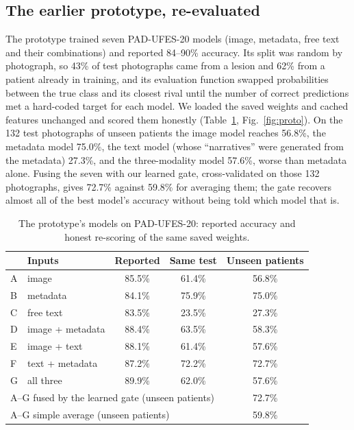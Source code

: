 \documentclass[conference]{IEEEtran}
\begin{document}
\subsection{The earlier prototype, re-evaluated}
\label{sec:proto}
The prototype trained seven PAD-UFES-20 models (image, metadata, free text and their combinations) and reported 84--90\% accuracy. Its split was random by photograph, so 43\% of test photographs came from a lesion and 62\% from a patient already in training, and its evaluation function swapped probabilities between the true class and its closest rival until the number of correct predictions met a hard-coded target for each model. We loaded the saved weights and cached features unchanged and scored them honestly (Table~\ref{tab:proto}, Fig.~\ref{fig:proto}). On the 132 test photographs of unseen patients the image model reaches 56.8\%, the metadata model 75.0\%, the text model (whose ``narratives'' were generated from the metadata) 27.3\%, and the three-modality model 57.6\%, worse than metadata alone. Fusing the seven with our learned gate, cross-validated on those 132 photographs, gives 72.7\% against 59.8\% for averaging them; the gate recovers almost all of the best model's accuracy without being told which model that is.

\begin{table}[!t]
\caption{The prototype's models on PAD-UFES-20: reported accuracy and honest re-scoring of the same saved weights.}
\label{tab:proto}
\centering\footnotesize
\begin{tabular}{llccc}
\toprule
 & Inputs & Reported & Same test & Unseen patients \\
\midrule
A & image & 85.5\% & 61.4\% & 56.8\% \\
B & metadata & 84.1\% & 75.9\% & 75.0\% \\
C & free text & 83.5\% & 23.5\% & 27.3\% \\
D & image + metadata & 88.4\% & 63.5\% & 58.3\% \\
E & image + text & 88.1\% & 61.4\% & 57.6\% \\
F & text + metadata & 87.2\% & 72.2\% & 72.7\% \\
G & all three & 89.9\% & 62.0\% & 57.6\% \\
\midrule
\multicolumn{4}{l}{A--G fused by the learned gate (unseen patients)} & 72.7\% \\
\multicolumn{4}{l}{A--G simple average (unseen patients)} & 59.8\% \\
\bottomrule
\end{tabular}
\end{table}
\end{document}
